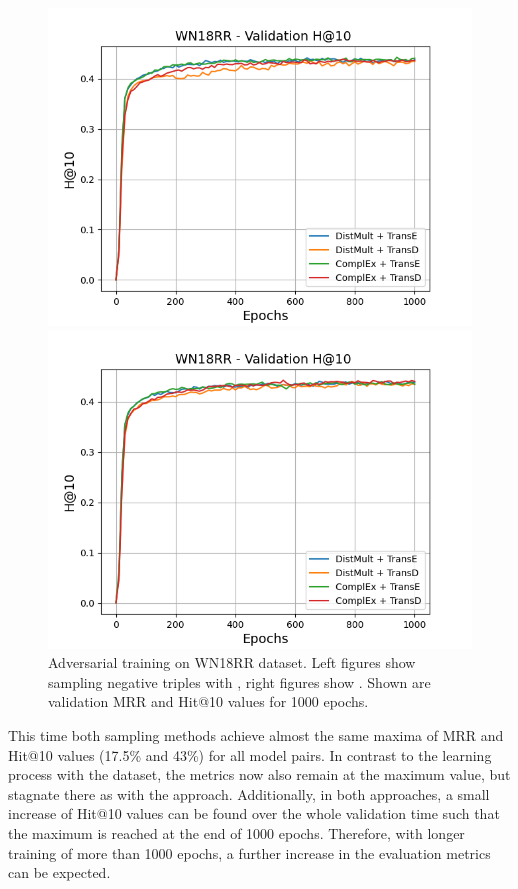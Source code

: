 \begin{figure}[H]
\begin{minipage}{.5\textwidth}
    \end{minipage}
    \begin{minipage}{.5\textwidth}
      \centering
      \includegraphics[width=0.9\linewidth]{figures/results/gan_train/not_pretrained/uncertainty/max/entropy/wn18rr/1k_epochs/uncertainty_wn18rr_hit10.png}
    \end{minipage}%
    \begin{minipage}{.5\textwidth}
      \centering
      \includegraphics[width=0.9\linewidth]{figures/results/gan_train/not_pretrained/uncertainty/max_distribution/entropy/wn18rr/1k_epochs/uncertainty_wn18rr_hit10.png}
    \end{minipage}%
    \caption{Adversarial training on \textsc{WN18RR} dataset. 
    Left figures show sampling negative triples with \usmax, right figures show \ussoftmax.
    Shown are validation MRR and Hit@10 values for 1000 epochs.}
    \label{fig:advtrain_wn18rr_usmax_ussoftmax}
\end{figure}
This time both sampling methods achieve almost the same maxima of MRR and Hit@10 values (17.5\% and 43\%) for all model pairs.
In contrast to the learning process with the \umls dataset, the metrics now also \usmax remain at the maximum value, but stagnate there as with the \ussoftmax approach.
Additionally, in both approaches, a small increase of Hit@10 values can be found over the whole validation time such that the maximum is reached at the end of 1000 epochs.
Therefore, with longer training of more than 1000 epochs, a further increase in the evaluation metrics can be expected.

